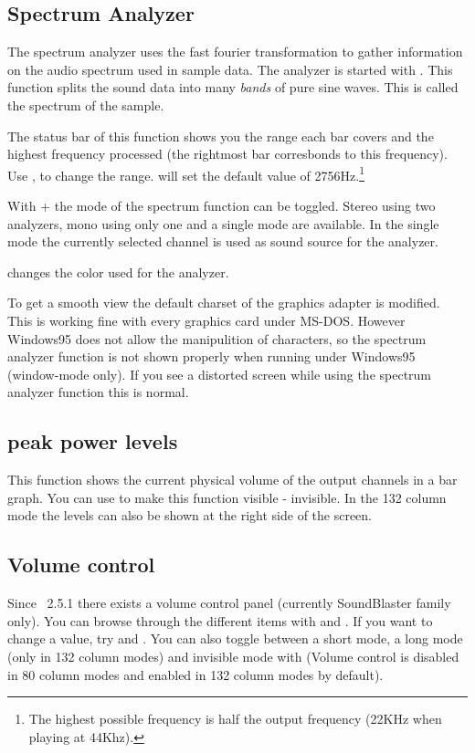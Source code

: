 \subsection{Spectrum Analyzer}
The spectrum analyzer uses the fast fourier transformation to gather
information on the audio spectrum used in sample data. The analyzer is
started with
. This function splits the sound data into many \emph{bands} of pure
sine waves. This is called the spectrum of the sample.

The status bar of this function shows you the range each bar covers
and the highest frequency processed (the rightmost bar corresbonds to
this frequency).  Use ,  to change the
range.  will set the default value of 2756Hz.\footnote{The
highest possible frequency is half the output frequency (22KHz when
playing at 44Khz).}

With + the mode of the spectrum function can be
toggled.  Stereo using two analyzers, mono using only one and a single
mode are available.  In the single mode the currently selected channel
is used as sound source for the analyzer.

 changes the color used for the analyzer.

{\small To get a smooth view the default charset of the graphics
adapter is modified. This is working fine with every graphics card
under MS-DOS\@. However Windows95 does not allow the manipulition of
characters, so the spectrum analyzer function is not shown properly
when running under Windows95 (window-mode only). If you see a
distorted screen while using the spectrum analyzer function this is
normal.}

\subsection{peak power levels}
This function shows the current physical volume of the output channels
in a bar graph. You can use  to make this function visible -
invisible.  In the 132 column mode the levels can also be shown at the
right side of the screen.

\subsection{Volume control}
Since \cp\ 2.5.1 there exists a volume control panel (currently
SoundBlaster family only). You can browse through the different items
with \keys{$\uparrow$} and \keys{$\downarrow$}. If you want to change
a value, try \keys{$\leftarrow$} and \keys{$\rightarrow$}. You can
also toggle between a short mode, a long mode (only in 132 column
modes) and invisible mode with  (Volume control is disabled in
80 column modes and enabled in 132 column modes by default).

